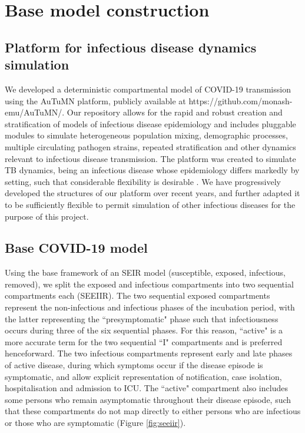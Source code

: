 \section{Base model construction}
\subsection{Platform for infectious disease dynamics simulation}

We developed a deterministic compartmental model of COVID-19 transmission using the AuTuMN platform,
publicly available at https://github.com/monash-emu/AuTuMN/.
Our repository allows for the rapid and robust creation and stratification of models of infectious disease epidemiology
and includes pluggable modules to simulate heterogeneous population mixing, demographic processes, multiple circulating
pathogen strains, repeated stratification and other dynamics relevant to infectious disease transmission.
The platform was created to simulate TB dynamics, being an infectious disease whose epidemiology differs markedly
by setting, such that considerable flexibility is desirable \cite{RN58}.
We have progressively developed the structures of our platform over recent years,
and further adapted it to be sufficiently flexible
to permit simulation of other infectious diseases for the purpose of this project.

\subsection{Base COVID-19 model}
Using the base framework of an SEIR model (susceptible, exposed, infectious, removed), we split the exposed and infectious compartments into two sequential compartments each (SEEIIR). The two sequential exposed compartments represent the non-infectious and infectious phases of the incubation period, with the latter representing the ``presymptomatic" phase such that infectiousness occurs during three of the six sequential phases. For this reason, ``active" is a more accurate term for the two sequential ``I" compartments and is preferred henceforward. The two infectious compartments represent early and late phases of active disease, during which symptoms occur if the disease episode is symptomatic, and allow explicit representation of notification, case isolation, hospitalisation and admission to ICU. The ``active" compartment also includes some persons who remain asymptomatic throughout their disease episode, such that these compartments do not map directly to either persons who are infectious or those who are symptomatic (Figure \ref{fig:seeiir}).

